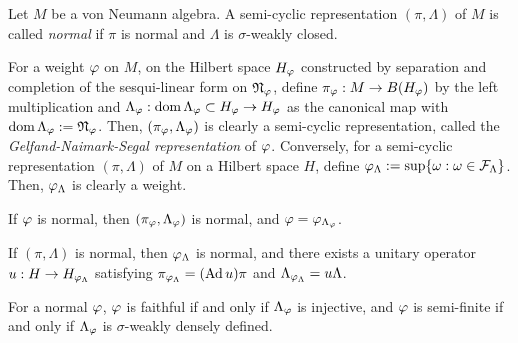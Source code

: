 \documentclass{../../large}
\begin{document}
\begin{prb}
Let $M$ be a von Neumann algebra.
A semi-cyclic representation $(\pi,\Lambda)$ of $M$ is called \emph{normal} if $\pi$ is normal and $\Lambda$ is $\sigma$-weakly closed.

For a weight $\varphi$ on $M$, on the Hilbert space $H_\varphi$ constructed by separation and completion of the sesqui-linear form on $\mathfrak{N}_\varphi$, define $\pi_\varphi:M\to B(H_\varphi)$ by the left multiplication and $\Lambda_\varphi:\operatorname{dom}\Lambda_\varphi\subset H_\varphi\to H_\varphi$ as the canonical map with $\operatorname{dom}\Lambda_\varphi:=\mathfrak{N}_\varphi$.
Then, $(\pi_\varphi,\Lambda_\varphi)$ is clearly a semi-cyclic representation, called the \emph{Gelfand-Naimark-Segal representation} of $\varphi$.
Conversely, for a semi-cyclic representation $(\pi,\Lambda)$ of $M$ on a Hilbert space $H$, define $\varphi_\Lambda:=\sup\{\omega:\omega\in\mathcal{F}_\Lambda\}$.
Then, $\varphi_\Lambda$ is clearly a weight.
\begin{parts}
\item If $\varphi$ is normal, then $(\pi_\varphi,\Lambda_\varphi)$ is normal, and $\varphi=\varphi_{\Lambda_\varphi}$.
\item If $(\pi,\Lambda)$ is normal, then $\varphi_\Lambda$ is normal, and there exists a unitary operator $u:H\to H_{\varphi_\Lambda}$ satisfying $\pi_{\varphi_\Lambda}=(\operatorname{Ad} u)\pi$ and $\Lambda_{\varphi_\Lambda}=u\Lambda$.
\item For a normal $\varphi$, $\varphi$ is faithful if and only if $\Lambda_\varphi$ is injective, and $\varphi$ is semi-finite if and only if $\Lambda_\varphi$ is $\sigma$-weakly densely defined.
\end{parts}
\end{prb}
\end{document}
